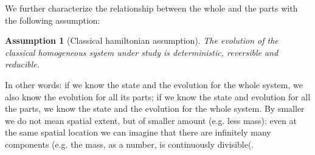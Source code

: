\documentclass[aps,pra,10pt,twocolumn,floatfix,nofootinbib]{revtex4-1}
\newtheorem{assump}{Assumption}
\theoremstyle{definition}
\begin{document}

We further characterize the relationship between the whole and the parts with the following assumption:

\begin{assump}[Classical hamiltonian assumption]\label{classical}
	The evolution of the classical homogeneous system under study is deterministic, reversible and reducible.
\end{assump}

In other words: if we know the state and the evolution for the whole system, we also know the evolution for all its parts; if we know the state and evolution for all the parts, we know the state and the evolution for the whole system. By smaller we do not mean spatial extent, but of smaller amount (e.g. less mass): even at the same spatial location we can imagine that there are infinitely many components (e.g. the mass, as a number, is continuously divisible(.
\end{document}
